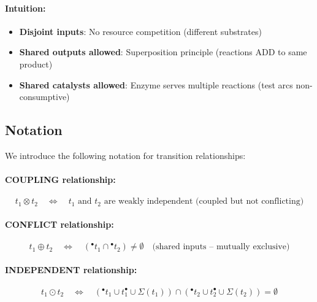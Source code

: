 \paragraph{Intuition:}
\begin{itemize}
    \item \textbf{Disjoint inputs}: No resource competition (different substrates)
    \item \textbf{Shared outputs allowed}: Superposition principle (reactions ADD to same product)
    \item \textbf{Shared catalysts allowed}: Enzyme serves multiple reactions (test arcs non-consumptive)
\end{itemize}

\subsection{Notation}
\label{subsec:weak-independence-notation}

We introduce the following notation for transition relationships:

\paragraph{COUPLING relationship:}
\begin{equation}
t_1 \otimes t_2 \quad \Longleftrightarrow \quad \text{$t_1$ and $t_2$ are weakly independent (coupled but not conflicting)}
\end{equation}

\paragraph{CONFLICT relationship:}
\begin{equation}
t_1 \oplus t_2 \quad \Longleftrightarrow \quad ({}^\bullet t_1 \cap {}^\bullet t_2) \neq \emptyset \quad \text{(shared inputs -- mutually exclusive)}
\end{equation}

\paragraph{INDEPENDENT relationship:}
\begin{equation}
t_1 \odot t_2 \quad \Longleftrightarrow \quad ({}^\bullet t_1 \cup t_1^\bullet \cup \Sigma(t_1)) \cap ({}^\bullet t_2 \cup t_2^\bullet \cup \Sigma(t_2)) = \emptyset
\end{equation}

